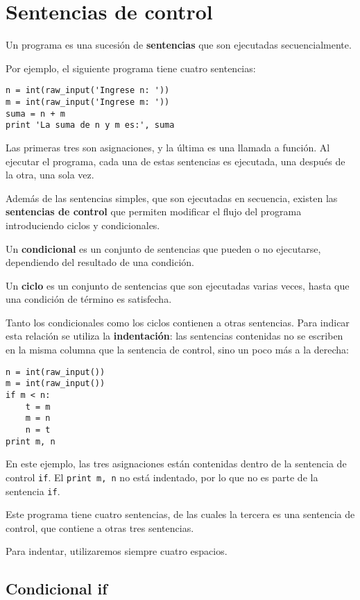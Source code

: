 \section{Sentencias de control}

Un programa es una sucesión de \textbf{sentencias} que son ejecutadas
secuencialmente.

Por ejemplo, el siguiente programa tiene cuatro sentencias:

\begin{lstlisting}
n = int(raw_input('Ingrese n: '))
m = int(raw_input('Ingrese m: '))
suma = n + m
print 'La suma de n y m es:', suma
\end{lstlisting}

Las primeras tres son asignaciones, y la última es una llamada a
función. Al ejecutar el programa, cada una de estas sentencias es
ejecutada, una después de la otra, una sola vez.

Además de las sentencias simples, que son ejecutadas en secuencia,
existen las \textbf{sentencias de control} que permiten modificar el
flujo del programa introduciendo ciclos y condicionales.

Un \textbf{condicional} es un conjunto de sentencias que pueden o no
ejecutarse, dependiendo del resultado de una condición.

Un \textbf{ciclo} es un conjunto de sentencias que son ejecutadas varias
veces, hasta que una condición de término es satisfecha.

Tanto los condicionales como los ciclos contienen a otras sentencias.
Para indicar esta relación se utiliza la \textbf{indentación}: las
sentencias contenidas no se escriben en la misma columna que la
sentencia de control, sino un poco más a la derecha:

\begin{lstlisting}
n = int(raw_input())
m = int(raw_input())
if m < n:
    t = m
    m = n
    n = t
print m, n
\end{lstlisting}

En este ejemplo, las tres asignaciones están contenidas dentro de la
sentencia de control \lstinline!if!. El \lstinline!print m, n! no está
indentado, por lo que no es parte de la sentencia \lstinline!if!.

Este programa tiene cuatro sentencias, de las cuales la tercera es una
sentencia de control, que contiene a otras tres sentencias.

Para indentar, utilizaremos siempre cuatro espacios.

\subsection{Condicional if}

